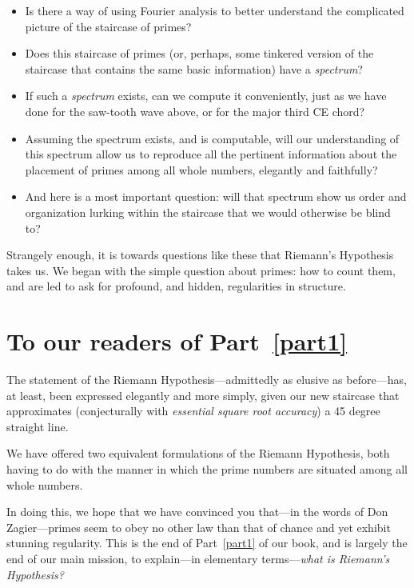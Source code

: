 \documentclass[openany]{book}
\theoremstyle{plain}
\theoremstyle{definition}
\newcommand{\RH}{Riemann Hypothesis\index{Riemann Hypothesis}}
\begin{document}
\begin{itemize}
\item Is there a way of using Fourier analysis to better understand
  the complicated picture of the staircase of primes?
 
\item Does this staircase of primes (or, perhaps, some tinkered
  version of the staircase that contains the same basic information)
  have a {\it spectrum}?

\item If such a {\it spectrum} exists, can we compute it conveniently,
  just as we have done for the saw-tooth wave above, or for the major
  third CE chord?
 

\item Assuming the spectrum exists, and is computable, will our
  understanding of this spectrum allow us to reproduce all the
  pertinent information about the placement of primes among all whole
  numbers, elegantly and faithfully?

\item And here is a most important question: will that spectrum show
  us order and organization lurking within the staircase that we would
  otherwise be blind to?
 
\end{itemize}
   

Strangely enough, it is towards questions like these that Riemann's
Hypothesis takes us. We began with the simple question about primes:
how to count them, and are led to ask for profound, and hidden,
regularities in structure.

\chapter{To our readers of Part~\ref{part1}} 
The statement of the \RH{}---admittedly as elusive as
before---has, at least, been expressed elegantly and more simply,
given our new staircase that approximates (conjecturally with {\em
  essential square root accuracy}) a 45 degree straight line.
   
We have offered two equivalent formulations of the \RH{},
both having to do with the manner in which the prime numbers are
situated among all whole numbers.

In doing this, we hope that we have convinced you that---in the words
of Don Zagier---primes seem to obey no other law than that of chance
and yet exhibit stunning regularity.  This is the end of Part~\ref{part1} of our
book, and is largely the end of our main mission, to explain---in
elementary terms---{\em what is Riemann's Hypothesis?}
    
\end{document}
